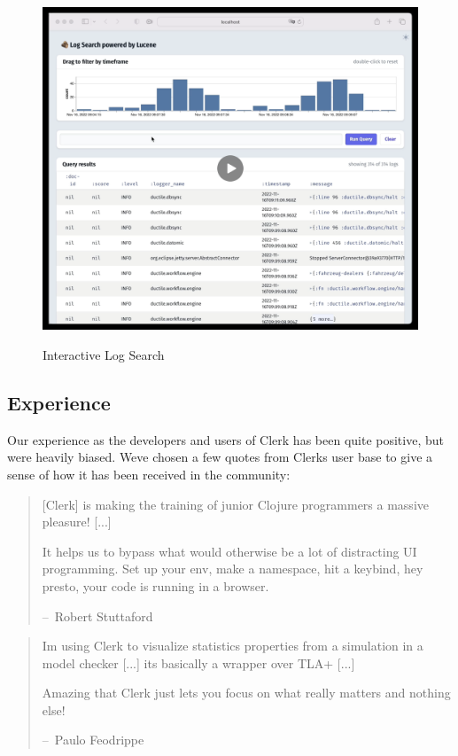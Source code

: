 \documentclass[sigconf,screen]{acmart}
\begin{document}
\begin{figure}
\hypertarget{interactive-log-search}{%
\centering
\href{https://cdn.nextjournal.com/data/QmRtGb5aByKD6i5SsxfS1JCJPKpC1kW5wbGvmT1h6awyB9?content-type=video/mp4}{\includegraphics{images/interactive-log-search.png}}
\caption{Interactive Log Search}\label{interactive-log-search}
}
\end{figure}

\hypertarget{experience}{%
\subsection{Experience}\label{experience}}

Our experience as the developers and users of Clerk has been quite positive, but we\textquotesingle re heavily biased. We\textquotesingle ve chosen a few quotes from Clerk\textquotesingle s user base to give a sense of how it has been received in the community:

\begin{quote}
{[}Clerk{]} is making the training of junior Clojure programmers a massive pleasure! {[}...{]}

It helps us to bypass what would otherwise be a lot of distracting UI programming. Set up your env, make a namespace, hit a keybind, hey presto, your code is running in a browser.

--~Robert Stuttaford
\end{quote}

\begin{quote}
I\textquotesingle m using Clerk to visualize statistics properties from a simulation in a model checker {[}...{]} it\textquotesingle s basically a wrapper over TLA+ {[}...{]}

Amazing that Clerk just lets you focus on what really matters and nothing else!

--~Paulo Feodrippe
\end{quote}
\end{document}
